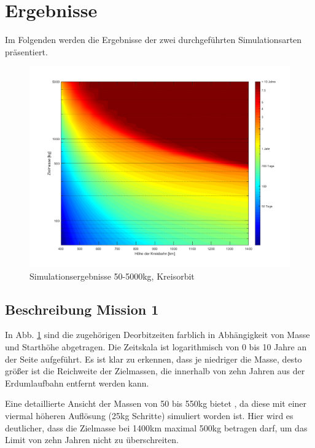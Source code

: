 \section{Ergebnisse}
Im Folgenden werden die Ergebnisse der zwei durchgeführten Simulationsarten präsentiert.
\begin{figure}[h]
\centering
\includegraphics[width=1.00\textwidth]{./graphics/GMAT/GMAT_Mass_over_Height.png}
\caption{Simulationsergebnisse 50-5000kg, Kreisorbit}
\label{fig:GMAT_Mass_over_Height}
\end{figure}

\subsection{Beschreibung Mission 1}
In Abb. \ref{fig:GMAT_Mass_over_Height} sind die zugehörigen Deorbitzeiten farblich in Abhängigkeit von Masse und Starthöhe abgetragen. Die Zeitskala ist logarithmisch von 0 bis 10 Jahre an der Seite aufgeführt.  
Es ist klar zu erkennen, dass je niedriger die Masse, desto größer ist die Reichweite der Zielmassen, die innerhalb von zehn Jahren aus der Erdumlaufbahn entfernt werden kann.


Eine detaillierte Ansicht der Massen von 50 bis 550kg bietet , da diese mit einer viermal höheren Auflösung (25kg Schritte) simuliert worden ist. Hier wird es deutlicher, dass die Zielmasse bei 1400km maximal 500kg betragen darf, um das Limit von zehn Jahren nicht zu überschreiten.

